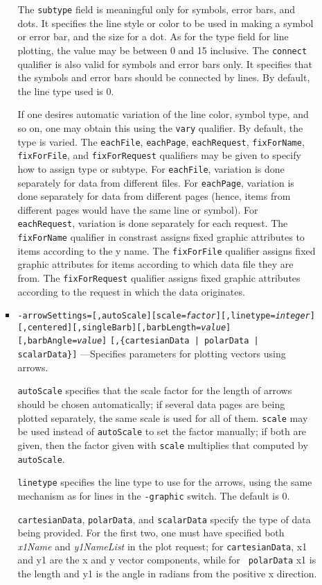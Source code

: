 \begin{itemize}
\begin{itemize}
\begin{itemize}
The {\tt subtype} field is meaningful only for symbols, error bars, and dots.  It specifies the line style
or color to be used in making a symbol or error bar, and the size for a dot.  As for the type field for
line plotting, the value may be between 0 and 15 inclusive.  The {\tt connect} qualifier is also valid for
symbols and error bars only.  It specifies that the symbols and error bars should be connected by lines.
By default, the line type used is 0.

If one desires automatic variation of the line color, symbol type, and
so on, one may obtain this using the \verb|vary| qualifier.  By
default, the type is varied.  The \verb|eachFile|, \verb|eachPage|,
\verb|eachRequest|, \verb|fixForName|, \verb|fixForFile|, and \verb|fixForRequest|
qualifiers may be given to specify how to
assign type or subtype.  For \verb|eachFile|, variation is done
separately for data from different files.  For \verb|eachPage|,
variation is done separately for data from different pages (hence,
items from different pages would have the same line or symbol).  For
\verb|eachRequest|, variation is done separately for each request.
The \verb|fixForName| qualifier in constrast assigns fixed graphic
attributes to items according to the y name.  The \verb|fixForFile|
qualifier assigns fixed graphic attributes for items according to which
data file they are from.  The \verb|fixForRequest| qualifier assigns fixed
graphic attributes according to the request in which the data originates.

  \item {\tt -arrowSettings=[,autoScale][scale={\em factor}][,linetype={\em integer}]}
{\tt [,centered][,singleBarb][,barbLength={\em value}][,barbAngle={\em value}]}
{\tt [,\{cartesianData | polarData | scalarData\}]}
---Specifies parameters for plotting vectors using arrows.

{\tt autoScale} specifies that the scale factor for the length of arrows should be chosen
automatically; if several data pages are being plotted separately, the same scale is used for all of
them.  {\tt scale} may be used instead of {\tt autoScale} to set the factor manually; if both are
given, then the factor given with {\tt scale} multiplies that computed by {\tt autoScale}.

{\tt linetype} specifies the line type to use for the arrows, using the same mechanism as for lines
in the {\tt -graphic} switch.  The default is 0.

{\tt cartesianData}, {\tt polarData}, and {\tt scalarData} specify the type of data being provided.
For the first two, one must have specified both {\em x1Name} and {\em y1NameList} in the plot
request; for {\tt cartesianData}, x1 and y1 are the x and y vector components, while for {\tt
polarData} x1 is the length and y1 is the angle in radians from the positive x direction.


\end{itemize}
\end{itemize}
\end{itemize}
